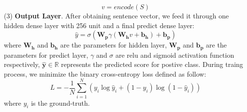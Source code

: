\documentclass[11pt,a4paper]{article}
\begin{document}
\begin{equation} 
v=encode\left(S\right)
\end{equation}
(3) \textbf{Output Layer}. After obtaining sentence vector, we feed it through one hidden dense layer with 256 unit and a final predict dense layer:
\begin{equation} 
 \hat{y}=\sigma\left(\mathbf{W_{p}} \gamma\left(\mathbf{W_{h}} v+\mathbf{b_{h}}\right)+\mathbf{b_{p}}\right)
 \end{equation} 
  where $\mathbf{W_{h}}$ and $\mathbf{b_{h}}$ are the parameters for hidden layer, $\mathbf{W_{p}}$ and $\mathbf{b_{p}}$ are the parameters for predict layer, $\gamma$ and $\sigma$ are relu and sigmoid activation function respectively, $\hat{\mathbf{y}} \in \mathbb{R}$ represents the predicted score for postive class. During traing process, we minimize the binary cross-entropy loss defined as follow:
\begin{equation} 
L=-\frac{1}{N} \sum_{i=1}^{N}\left(y_{i} \log \hat{y}_{i}+\left(1-y_{i}\right) \log \left(1-\hat{y}_{i}\right)\right)
\end{equation}
 where $y_{i}$ is the ground-truth.
\end{document}
